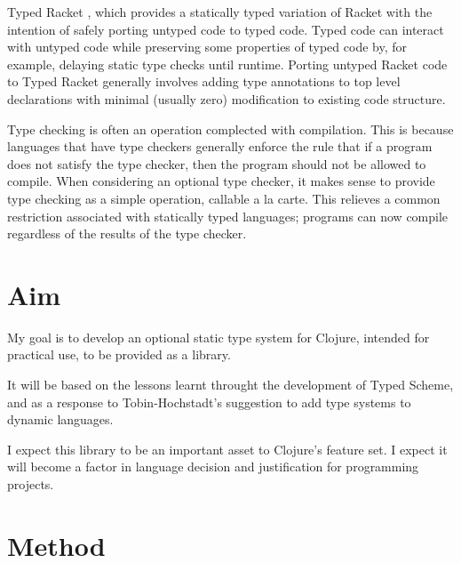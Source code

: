 \documentclass[12pt, a4paper]{article}
\begin{document}
Typed Racket \cite{TypedScheme:2010}
, which provides a statically typed variation of Racket 
with the intention of safely porting untyped code to typed code. 
Typed code can interact with untyped code while preserving some properties
of typed code by, for example, delaying static type checks until runtime.
Porting untyped Racket code to Typed Racket generally involves 
adding type annotations to top level declarations with minimal (usually zero)
modification to existing code structure.

Type checking is often an operation complected with compilation. This is
because languages that have type checkers generally enforce the rule that
if a program does not satisfy the type checker, then the program should not be 
allowed to compile. When considering an optional type checker, it makes sense
to provide type checking as a simple operation, callable a la carte. 
This relieves a common restriction associated with statically typed languages;
programs can now compile regardless of the results of the 
type checker.


\section*{Aim} 


My goal is to develop an optional static type system for Clojure, 
intended for practical use, to be provided as a library.

It will be based on the lessons learnt throught the development
of Typed Scheme, and as a response to Tobin-Hochstadt's \cite{TypedScheme:2010}
suggestion to add type systems to dynamic languages.

I expect this library to be an important asset to Clojure's feature set.
I expect it will become a factor in language decision and justification for programming projects.

\section*{Method}

\end{document}

